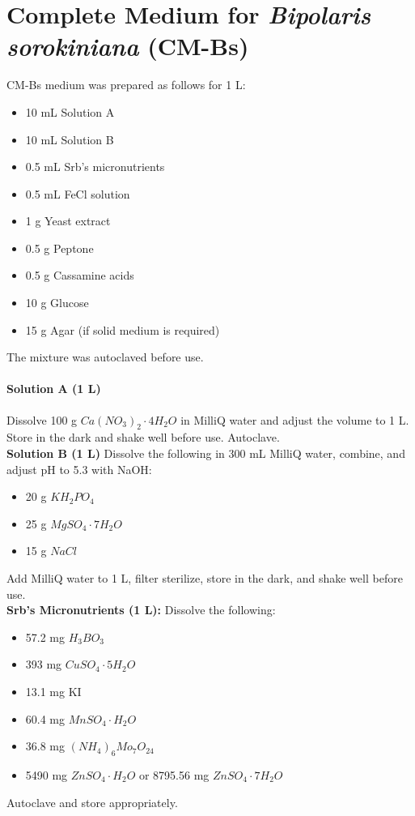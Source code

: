 \appendix
\appendixpage
\addappheadtotoc
    
\section*{Complete Medium for \textit{Bipolaris sorokiniana} (CM-Bs)}

CM-Bs medium was prepared as follows for 1 L:
\begin{itemize}[nosep]
    \item 10 mL Solution A
    \item 10 mL Solution B
    \item 0.5 mL Srb's micronutrients
    \item 0.5 mL FeCl solution
    \item 1 g Yeast extract
    \item 0.5 g Peptone
    \item 0.5 g Cassamine acids
    \item 10 g Glucose
    \item 15 g Agar (if solid medium is required)
\end{itemize}
The mixture was autoclaved before use.

\paragraph{Solution A (1 L)}
Dissolve 100 g $Ca(NO_3)_2 \cdot 4H_2O$ in MilliQ water and adjust the volume to 1 L. Store in the dark and shake well before use. Autoclave.
\\
\textbf{Solution B (1 L)}
Dissolve the following in 300 mL MilliQ water, combine, and adjust pH to 5.3 with NaOH:
\begin{itemize}[nosep]
    \item 20 g $KH_2PO_4$
    \item 25 g $MgSO_4 \cdot 7H_2O$
    \item 15 g $NaCl$
\end{itemize}
Add MilliQ water to 1 L, filter sterilize, store in the dark, and shake well before use.
\\
\textbf{Srb's Micronutrients (1 L):}
Dissolve the following:
\begin{itemize}[nosep]
    \item 57.2 mg $H_3BO_3$
    \item 393 mg $CuSO_4 \cdot 5H_2O$
    \item 13.1 mg KI
    \item 60.4 mg $MnSO_4 \cdot H_2O$
    \item 36.8 mg $(NH_4)_6Mo_7O_{24}$
    \item 5490 mg $ZnSO_4 \cdot H_2O$ or 8795.56 mg $ZnSO_4 \cdot 7H_2O$
\end{itemize}
Autoclave and store appropriately.